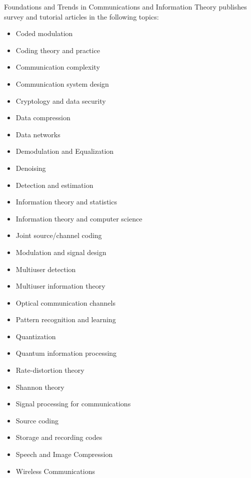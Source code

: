 


\journalaimsandscope
 {%
 Foundations and Trends\textsuperscript{\textregistered} in
Communications and Information Theory publishes
 survey and tutorial articles in the following topics:
 \begin{multicols}{2}\raggedcolumns
 \begin{itemize}
\item{Coded modulation}
\item{Coding theory and practice}
\item{Communication complexity}
\item{Communication system design}
\item{Cryptology and data security}
\item{Data compression}
\item{Data networks}
\item{Demodulation and Equalization}
\item{Denoising}
\item{Detection and estimation}
\item{Information theory and statistics}
\item{Information theory and computer science}
\item{Joint source/channel coding}
\item{Modulation and signal design}
\item{Multiuser detection}
\item{Multiuser information theory}
\item{Optical communication channels}
\item{Pattern recognition and learning}
\item{Quantization}
\item{Quantum information processing}
\item{Rate-distortion theory}
\item{Shannon theory}
\item{Signal processing for communications}
\item{Source coding}
\item{Storage and recording codes}
\item{Speech and Image Compression}
\item{Wireless Communications}
\end{itemize}
 \end{multicols}
 }


